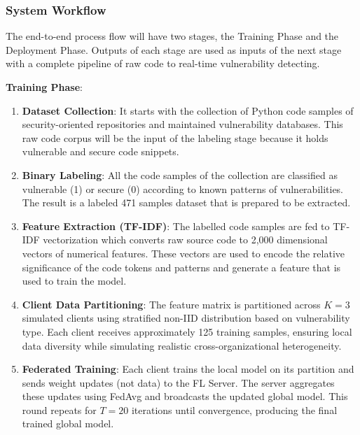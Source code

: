 \documentclass[pdflatex,sn-mathphys-num]{sn-jnl}
\theoremstyle{thmstyleone}%
\theoremstyle{thmstyletwo}%
\theoremstyle{thmstylethree}%
\begin{document}
\FloatBarrier

\subsubsection{System Workflow}\label{subsubsec:workflow}

The end-to-end process flow will have two stages, the Training Phase and the Deployment Phase. Outputs of each stage are used as inputs of the next stage with a complete pipeline of raw code to real-time vulnerability detecting.


\textbf{Training Phase}:

\begin{enumerate}
    \item \textbf{Dataset Collection}: It starts with the collection of Python code samples of security-oriented repositories and maintained vulnerability databases. This raw code corpus will be the input of the labeling stage because it holds vulnerable and secure code snippets.
    
    \item \textbf{Binary Labeling}: All the code samples of the collection are classified as vulnerable (1) or secure (0) according to known patterns of vulnerabilities. The result is a labeled 471 samples dataset that is prepared to be extracted.
    
    \item \textbf{Feature Extraction (TF-IDF)}: The labelled code samples are fed to TF-IDF vectorization which converts raw source code to 2,000 dimensional vectors of numerical features. These vectors are used to encode the relative significance of the code tokens and patterns and generate a feature that is used to train the model.
    
    \item \textbf{Client Data Partitioning}: The feature matrix is partitioned across $K=3$ simulated clients using stratified non-IID distribution based on vulnerability type. Each client receives approximately 125 training samples, ensuring local data diversity while simulating realistic cross-organizational heterogeneity.
    
    \item \textbf{Federated Training}: Each client trains the local model on its partition and sends weight updates (not data) to the FL Server. The server aggregates these updates using FedAvg and broadcasts the updated global model. This round repeats for $T=20$ iterations until convergence, producing the final trained global model.
\end{enumerate}
\end{document}

